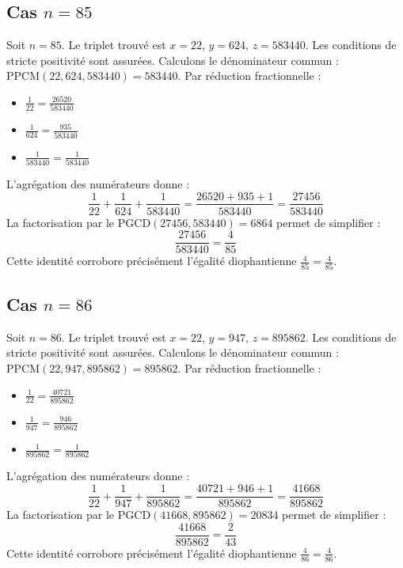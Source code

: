 \documentclass[11pt,a4paper]{article}
\begin{document}
\subsection{Cas $n = 85$}
Soit $n = 85$. Le triplet trouvé est $x = 22$, $y = 624$, $z = 583440$.
Les conditions de stricte positivité sont assurées.
Calculons le dénominateur commun : $\text{PPCM}(22, 624, 583440) = 583440$.
Par réduction fractionnelle :
\begin{itemize}
    \item $\frac{1}{22} = \frac{26520}{583440}$
    \item $\frac{1}{624} = \frac{935}{583440}$
    \item $\frac{1}{583440} = \frac{1}{583440}$
\end{itemize}
L'agrégation des numérateurs donne :
$$ \frac{1}{22} + \frac{1}{624} + \frac{1}{583440} = \frac{26520 + 935 + 1}{583440} = \frac{27456}{583440} $$
La factorisation par le $\text{PGCD}(27456, 583440) = 6864$ permet de simplifier :
$$ \frac{27456}{583440} = \frac{4}{85} $$
Cette identité corrobore précisément l'égalité diophantienne $\frac{4}{85} = \frac{4}{85}$.

\subsection{Cas $n = 86$}
Soit $n = 86$. Le triplet trouvé est $x = 22$, $y = 947$, $z = 895862$.
Les conditions de stricte positivité sont assurées.
Calculons le dénominateur commun : $\text{PPCM}(22, 947, 895862) = 895862$.
Par réduction fractionnelle :
\begin{itemize}
    \item $\frac{1}{22} = \frac{40721}{895862}$
    \item $\frac{1}{947} = \frac{946}{895862}$
    \item $\frac{1}{895862} = \frac{1}{895862}$
\end{itemize}
L'agrégation des numérateurs donne :
$$ \frac{1}{22} + \frac{1}{947} + \frac{1}{895862} = \frac{40721 + 946 + 1}{895862} = \frac{41668}{895862} $$
La factorisation par le $\text{PGCD}(41668, 895862) = 20834$ permet de simplifier :
$$ \frac{41668}{895862} = \frac{2}{43} $$
Cette identité corrobore précisément l'égalité diophantienne $\frac{4}{86} = \frac{4}{86}$.
\end{document}
